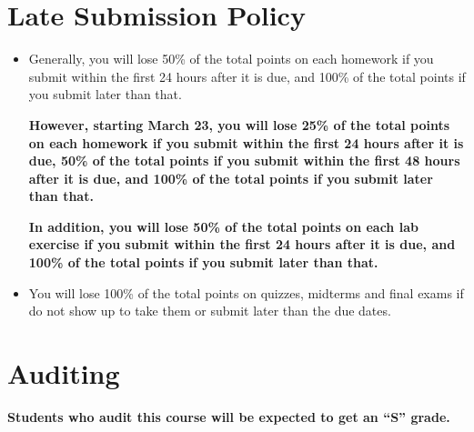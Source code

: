 \documentclass[11pt, a4paper]{article}
\begin{document}
\section{Late Submission Policy} 
\begin{itemize}
	\item Generally, you will lose 50\% of the total points on each homework if you submit within the first 24 hours after it is due, and 100\% of the total points if you submit later than that.
	
	{\color{darkred} \textbf{However, starting March 23, you will lose 25\% of the total points on each homework if you submit within the first 24 hours after it is due, 50\% of the total points if you submit within the first 48 hours after it is due, and 100\% of the total points if you submit later than that.}}
	
	{\color{darkred} \textbf{In addition, you will lose 50\% of the total points on each lab exercise if you submit within the first 24 hours after it is due, and 100\% of the total points if you submit later than that.}}
	
	\item You will lose 100\% of the total points on quizzes, midterms and final exams if do not show up to take them or submit later than the due dates.
\end{itemize}


\section{Auditing}
{\color{darkred} \textbf{Students who audit this course will be expected to get an ``S'' grade.}}
\end{document}
